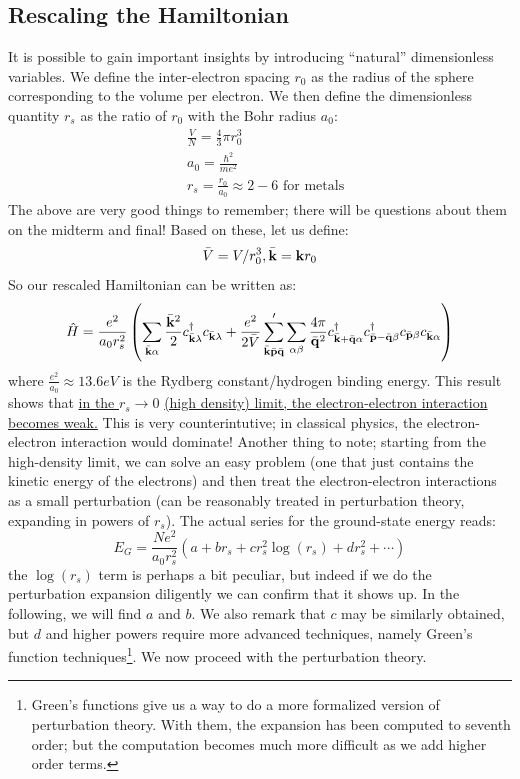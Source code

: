 \subsection{Rescaling the Hamiltonian}
It is possible to gain important insights by introducing ``natural'' dimensionless variables. We define the inter-electron spacing $r_0$ as the radius of the sphere corresponding to the volume per electron. We then define the dimensionless quantity $r_s$ as the ratio of $r_0$ with the Bohr radius $a_0$:
\begin{equation}
    \begin{split}
        &\frac{V}{N} = \frac{4}{3}\pi r_0^3
        \\ &a_0 = \frac{\hbar^2}{me^2}
        \\ &\boxed{r_s = \frac{r_0}{a_0} \approx 2-6 \text{ for metals}}
    \end{split}
\end{equation}
The above are very good things to remember; there will be questions about them on the midterm and final!
Based on these, let us define:
\begin{equation}
    \bar{V} = V/r_0^3, \bar{\mathbf{k}} = \mathbf{k}r_0
\end{equation}
So our rescaled Hamiltonian can be written as:
\begin{equation}
    \hat{H} = \frac{e^2}{a_0r_s^2}\left(\sum_{\bar{\mathbf{k}}\alpha} \frac{\bar{\mathbf{k}}^2}{2}c^\dagger_{\bar{\mathbf{k}}\lambda}c_{\bar{\mathbf{k}}\lambda} + \frac{e^2}{2\bar{V}}\sum_{\bar{\mathbf{k}}\bar{\mathbf{p}}\bar{\mathbf{q}}}'\sum_{\alpha\beta} \frac{4\pi}{\bar{\mathbf{q}}^2}c^\dagger_{\bar{\mathbf{k}} + \bar{\mathbf{q}}\alpha}c^{\dagger}_{\bar{\mathbf{p}} - \bar{\mathbf{q}}\beta}c_{\bar{\mathbf{p}}\beta}c_{\bar{\mathbf{k}}\alpha}\right)
\end{equation}
where $\frac{e^2}{a_0} \approx 13.6\si{eV}$ is the Rydberg constant/hydrogen binding energy. This result shows that \underline{in the $r_s \to 0$} \underline{(high density) limit, the electron-electron interaction becomes weak.} This is very counterintutive; in classical physics, the electron-electron interaction would dominate! Another thing to note; starting from the high-density limit, we can solve an easy problem (one that just contains the kinetic energy of the electrons) and then treat the electron-electron interactions as a small perturbation (can be reasonably treated in perturbation theory, expanding in powers of $r_s$). The actual series for the ground-state energy reads:
\begin{equation}
    E_G = \frac{Ne^2}{a_0r_s^2}\left(a + br_s + cr_s^2 \log(r_s) + dr_s^2 + \cdots\right)
\end{equation}
the $\log(r_s)$ term is perhaps a bit peculiar, but indeed if we do the perturbation expansion diligently we can confirm that it shows up. In the following, we will find $a$ and $b$. We also remark that $c$ may be similarly obtained, but $d$ and higher powers require more advanced techniques, namely Green's function techniques\footnote{Green's functions give us a way to do a more formalized version of perturbation theory. With them, the expansion has been computed to seventh order; but the computation becomes much more difficult as we add higher order terms.}. We now proceed with the perturbation theory.

